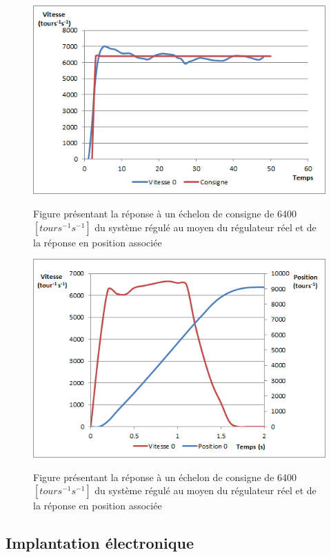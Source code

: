 \begin{figure}[htbp]
\centering
\includegraphics[scale=0.6]{fig/asservissement_3.png}
\label{fig:as_2}
\caption{Figure présentant la réponse à un échelon de consigne de 6400$\left[tours^{-1}s^{-1}\right]$ du système régulé au moyen du régulateur réel et de la réponse en position associée}
\end{figure}
\begin{figure}[htbp]
\centering
\includegraphics[scale=0.6]{fig/asservissement_2.png}
\label{fig:as_3}
\caption{Figure présentant la réponse à un échelon de consigne de 6400$\left[tours^{-1}s^{-1}\right]$ du système régulé au moyen du régulateur réel et de la réponse en position associée}
\end{figure}
\subsection{Implantation électronique}
